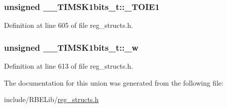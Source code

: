 \hypertarget{union_____t_i_m_s_k1bits__t_a6c48fb5a18bc0b54786423745de5d24e}{
\subsubsection[{\+\_\+\+T\+O\+I\+E1}]{\setlength{\rightskip}{0pt plus 5cm}unsigned \+\_\+\+\_\+\+T\+I\+M\+S\+K1bits\+\_\+t\+::\+\_\+\+T\+O\+I\+E1}}\label{union_____t_i_m_s_k1bits__t_a6c48fb5a18bc0b54786423745de5d24e}


Definition at line 605 of file reg\+\_\+structs.\+h.

\hypertarget{union_____t_i_m_s_k1bits__t_a74e0285088f5c632162f2b0e30698940}{
\subsubsection[{\+\_\+w}]{\setlength{\rightskip}{0pt plus 5cm}unsigned \+\_\+\+\_\+\+T\+I\+M\+S\+K1bits\+\_\+t\+::\+\_\+w}}\label{union_____t_i_m_s_k1bits__t_a74e0285088f5c632162f2b0e30698940}


Definition at line 613 of file reg\+\_\+structs.\+h.



The documentation for this union was generated from the following file\+:\begin{DoxyCompactItemize}
\item 
include/\+R\+B\+E\+Lib/\hyperlink{reg__structs_8h}{reg\+\_\+structs.\+h}\end{DoxyCompactItemize}
